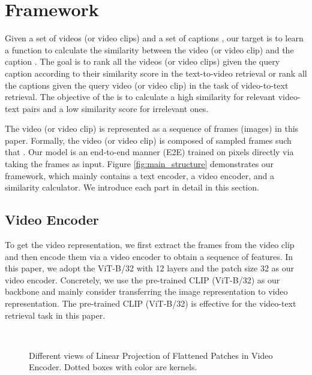 \documentclass[11pt]{article}
\begin{document}
	\section{Framework}
	Given a set of videos (or video clips)  and a set of captions , our target is to learn a function  to calculate the similarity between the video (or video clip)  and the caption . The goal is to rank all the videos (or video clips) given the query caption according to their similarity score in the text-to-video retrieval or rank all the captions given the query video (or video clip) in the task of video-to-text retrieval. The objective of the  is to calculate a high similarity for relevant video-text pairs and a low similarity score for irrelevant ones.

	The video (or video clip)  is represented as a sequence of frames (images) in this paper. Formally, the video (or video clip)  is composed of  sampled frames such that . Our model is an end-to-end manner (E2E) trained on pixels directly via taking the frames as input. Figure \ref{fig:main_structure} demonstrates our framework, which mainly contains a text encoder, a video encoder, and a similarity calculator. We introduce each part in detail in this section.

	\subsection{Video Encoder}
	\label{sec:video_encoder}
	To get the video representation, we first extract the frames from the video clip and then encode them via a video encoder to obtain a sequence of features. In this paper, we adopt the ViT-B/32 \cite{dosovitskiy2021an} with 12 layers and the patch size 32 as our video encoder. Concretely, we use the pre-trained CLIP (ViT-B/32) \cite{radford2021learning} as our backbone and mainly consider transferring the image representation to video representation. The pre-trained CLIP (ViT-B/32) is effective for the video-text retrieval task in this paper.
	\begin{figure}[tbp]
		\centering
		 \\
		\caption{Different views of Linear Projection of Flattened Patches in Video Encoder. Dotted boxes with color are kernels.}\label{fig_linear}
	\end{figure}
\end{document}
